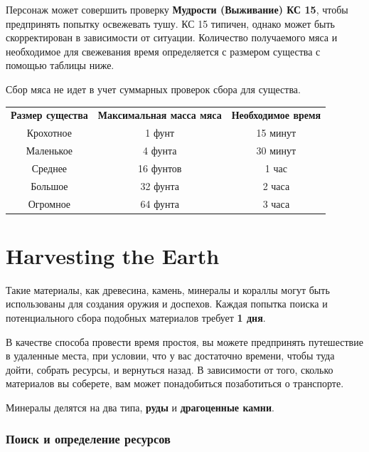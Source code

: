 \documentclass[a4paper, 9pt, twocolumn]{book}
\begin{document}
	Персонаж может совершить проверку \textbf{Мудрости (Выживание) КС 15}, чтобы предпринять попытку освежевать тушу. КС 15 типичен, однако может быть скорректирован в зависимости от ситуации. Количество получаемого мяса и необходимое для свежевания время определяется с размером существа с помощью таблицы ниже.
	
	Сбор мяса не идет в учет суммарных проверок сбора для существа.
	
		\begin{table}[H]
			
			\centering
			
			\begin{tabularx}{\linewidth}{C C C}
				\textbf{Размер существа} & \textbf{Максимальная масса мяса} & \textbf{Необходимое время} \\
				Крохотное & 1 фунт & 15 минут \\
				Маленькое & 4 фунта & 30 минут \\
				Среднее & 16 фунтов & 1 час \\
				Большое & 32 фунта & 2 часа \\
				Огромное & 64 фунта & 3 часа \\
			\end{tabularx}
		\end{table}
	
	
	
	\section{Harvesting the Earth}
	
	Такие материалы, как древесина, камень, минералы и кораллы могут быть использованы для создания оружия и доспехов. Каждая попытка поиска и потенциального сбора подобных материалов требует \textbf{1 дня}.
	
	В качестве способа провести время простоя, вы можете предпринять путешествие в удаленные места, при условии, что у вас достаточно времени, чтобы туда дойти, собрать ресурсы, и вернуться назад. В зависимости от того, сколько материалов вы соберете, вам может понадобиться позаботиться о транспорте.
	
	Минералы делятся на два типа, \textbf{руды} и \textbf{драгоценные камни}.
	
	\subsubsection{Поиск и определение ресурсов}
	
\end{document}
